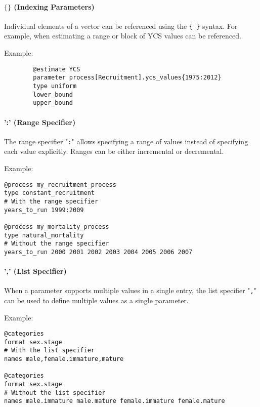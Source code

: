 \paragraph*{$\{ \}$ (Indexing Parameters)}

Individual elements of a vector can be referenced using the \texttt{\{ \}} syntax. For example, when estimating  a range or block of YCS values can be referenced.

Example:

{\small{\begin{verbatim}
		@estimate YCS
		parameter process[Recruitment].ycs_values{1975:2012}
		type uniform
		lower_bound
		upper_bound
		\end{verbatim}}}

\paragraph*{':' (Range Specifier)}

The range specifier "\texttt{:}" allows specifying a range of values instead of specifying each value explicitly. Ranges can be either incremental or decremental.

Example:

{\small{\begin{verbatim}
@process my_recruitment_process
type constant_recruitment
# With the range specifier
years_to_run 1999:2009

@process my_mortality_process
type natural_mortality
# Without the range specifier
years_to_run 2000 2001 2002 2003 2004 2005 2006 2007
\end{verbatim}}}

\paragraph*{',' (List Specifier)}

When a parameter supports multiple values in a single entry, the list specifier "\texttt{,}" can be used to define multiple values as a single parameter.

Example:

{\small{\begin{verbatim}
@categories
format sex.stage
# With the list specifier
names male,female.immature,mature

@categories
format sex.stage
# Without the list specifier
names male.immature male.mature female.immature female.mature
\end{verbatim}}}

